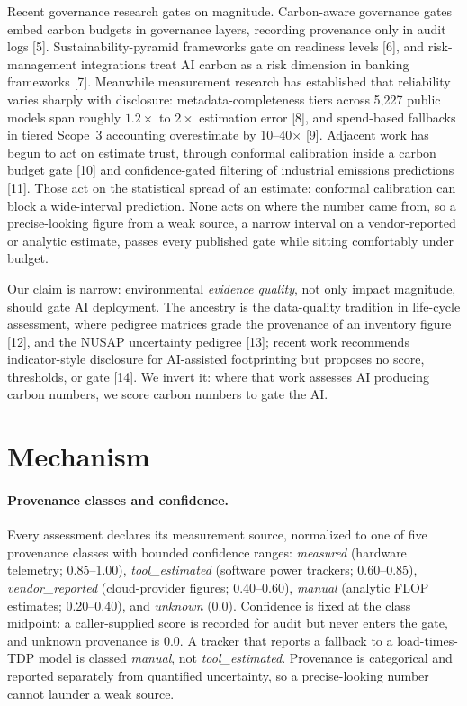 \documentclass{article}
\begin{document}
Recent governance research gates on magnitude. Carbon-aware governance gates
embed carbon budgets in governance layers, recording provenance only in audit
logs [5]. Sustainability-pyramid frameworks gate on readiness levels [6], and
risk-management integrations treat AI carbon as a risk dimension in banking
frameworks [7]. Meanwhile measurement research has established that
reliability varies sharply with disclosure: metadata-completeness tiers across
5{,}227 public models span roughly $1.2\times$ to $2\times$ estimation error
[8], and spend-based fallbacks in tiered Scope~3 accounting overestimate by
10--40$\times$ [9]. Adjacent work has begun to act on estimate trust, through
conformal calibration inside a carbon budget gate [10] and confidence-gated
filtering of industrial emissions predictions [11]. Those act on the
statistical spread of an estimate: conformal calibration can block a
wide-interval prediction. None acts on where the number came from, so a
precise-looking figure from a weak source, a narrow interval on a
vendor-reported or analytic estimate, passes every published gate while
sitting comfortably under budget.

Our claim is narrow: environmental \emph{evidence quality}, not only impact
magnitude, should gate AI deployment. The ancestry is the data-quality
tradition in life-cycle assessment, where pedigree matrices grade the
provenance of an inventory figure [12], and the NUSAP uncertainty pedigree
[13]; recent work recommends indicator-style disclosure for AI-assisted
footprinting but proposes no score, thresholds, or gate [14]. We invert it:
where that work assesses AI producing carbon numbers, we score carbon numbers
to gate the AI.

\section{Mechanism}

\paragraph{Provenance classes and confidence.} Every assessment declares its
measurement source, normalized to one of five provenance classes with bounded
confidence ranges: \emph{measured} (hardware telemetry; 0.85--1.00),
\emph{tool\_estimated} (software power trackers; 0.60--0.85),
\emph{vendor\_reported} (cloud-provider figures; 0.40--0.60), \emph{manual}
(analytic FLOP estimates; 0.20--0.40), and \emph{unknown} (0.0). Confidence is
fixed at the class midpoint: a caller-supplied score is recorded for audit but
never enters the gate, and unknown provenance is 0.0. A tracker that reports a
fallback to a load-times-TDP model is classed \emph{manual}, not
\emph{tool\_estimated}. Provenance is categorical and reported separately from
quantified uncertainty, so a precise-looking number cannot launder a weak
source.
\end{document}
